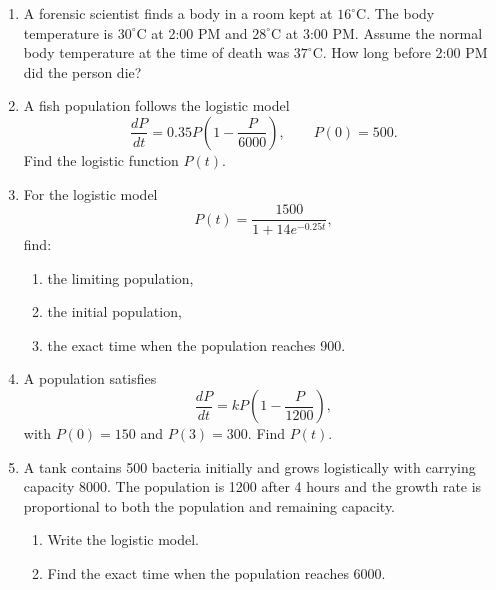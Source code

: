 \documentclass[12pt]{article}
\begin{document}
\begin{enumerate}[leftmargin=*, itemsep=1em, topsep=0.8em]
  \item A forensic scientist finds a body in a room kept at $16^\circ$C. The body temperature is $30^\circ$C at 2:00 PM and $28^\circ$C at 3:00 PM. Assume the normal body temperature at the time of death was $37^\circ$C. How long before 2:00 PM did the person die?

  \item A fish population follows the logistic model
  \[
  \frac{dP}{dt}=0.35P\left(1-\frac{P}{6000}\right), \qquad P(0)=500.
  \]
  Find the logistic function $P(t)$.

  \item For the logistic model
  \[
  P(t)=\frac{1500}{1+14e^{-0.25t}},
  \]
  find:
  \begin{enumerate}[label=\alph*)]
    \item the limiting population,
    \item the initial population,
    \item the exact time when the population reaches 900.
  \end{enumerate}

  \item A population satisfies
  \[
  \frac{dP}{dt}=kP\left(1-\frac{P}{1200}\right),
  \]
  with $P(0)=150$ and $P(3)=300$. Find $P(t)$.

  \item A tank contains 500 bacteria initially and grows logistically with carrying capacity 8000. The population is 1200 after 4 hours and the growth rate is proportional to both the population and remaining capacity.
  \begin{enumerate}[label=\alph*)]
    \item Write the logistic model.
    \item Find the exact time when the population reaches 6000.
  \end{enumerate}
\end{enumerate}
\end{document}
